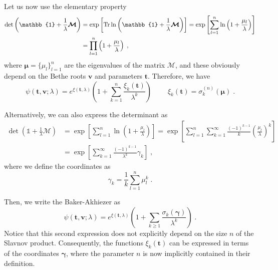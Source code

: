 \documentclass[a4paper,12pt]{amsart}
\begin{document}
Let us now use the elementary property
\begin{subequations}
\begin{equation}
  \begin{split}
    \det \left( \mathbb{1} + \frac{1}{\lambda} \bm{\mathcal{M}}\right)
    & = \exp \left[ \Tr \ln \left( \mathbb{1} + \frac{1}{\lambda} \bm{\mathcal{M}} \right) \right]
    = \exp\left[ \sum_{l=1}^n \ln \left( 1 + \frac{\mu_l}{\lambda} \right)\right]\\
    & = \prod_{l=1}^n \left( 1 + \frac{\mu_l}{\lambda} \right) \; ,
  \end{split}
\end{equation}
\end{subequations}
where \(\bm{\mu} = \{\mu_l\}_{l=1}^n\) are the eigenvalues of the
matrix \(\bm{\mathcal{M}}\), and these obviously depend on the Bethe
roots \(\bm{v}\) and parameters \(\bm{t}\).  Therefore, we have
\begin{equation}
  \psi(\bm{t},\bm{v}; \lambda) = e^{\xi(\bm{t}, \lambda)}
  \left(1 + \sum_{k=1}^n \frac{\xi_k(\bm{t})}{\lambda^k} 
  \right)\; \qquad \xi_k(\bm{t}) = \sigma_k^{(n)}(\bm{\mu})\; .
\end{equation}

Alternatively, we can also express the determinant as
\begin{equation}
  \begin{split}
    \det \left( \mathbb{1} + \frac{1}{\lambda} \bm{\mathcal{M}}\right)
    & = \exp\left[ \sum_{l=1}^n \ln \left( 1 + \frac{\mu_l}{\lambda} \right)\right]
    = \exp\left[ \sum_{l=1}^n \sum_{k=1}^\infty \frac{(-1)^{k-1}}{k} \left(\frac{\mu_l}{\lambda} \right)^k\right] \\ 
    & = \exp\left[ \sum_{k=1}^\infty \frac{(-1)^{k-1}}{\lambda^k} \gamma_k\right] \; ,
  \end{split}
\end{equation}
where we define the coordinates as 
\begin{equation}
\gamma_k = \frac{1}{k} \sum_{l=1}^n \mu_l^k\; .
\end{equation}

Then, we write the Baker-Akhiezer as 
\begin{equation}
  \psi(\bm{t},\bm{v}; \lambda) = e^{\xi(\bm{t}, \lambda)}
  \left(1 + \sum_{k\geq 1} \frac{\sigma_k(\bm{\gamma})}{\lambda^k} 
  \right)\; .
\end{equation}
Notice that this second expression does not explicitly depend on the
size \(n\) of the Slavnov product. Consequently, the functions
\(\xi_k(\bm{t})\) can be expressed in terms of the coordinates
\(\bm{\gamma}\), where the parameter \(n\) is now implicitly contained
in their definition.
\end{document}
